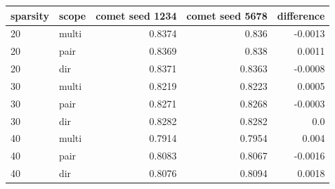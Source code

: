 \begin{tabular}{llrrr}
\toprule
sparsity & scope & comet seed 1234 & comet seed 5678 & difference \\
\midrule
20 & multi & 0.8374 & 0.836 & -0.0013 \\
20 & pair & 0.8369 & 0.838 & 0.0011 \\
20 & dir & 0.8371 & 0.8363 & -0.0008 \\
30 & multi & 0.8219 & 0.8223 & 0.0005 \\
30 & pair & 0.8271 & 0.8268 & -0.0003 \\
30 & dir & 0.8282 & 0.8282 & 0.0 \\
40 & multi & 0.7914 & 0.7954 & 0.004 \\
40 & pair & 0.8083 & 0.8067 & -0.0016 \\
40 & dir & 0.8076 & 0.8094 & 0.0018 \\
\bottomrule
\end{tabular}
